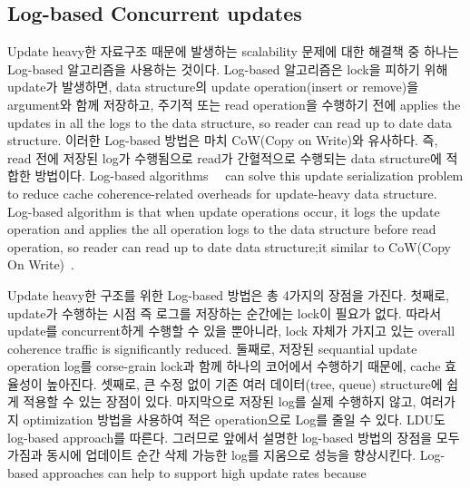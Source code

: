 \subsection{Log-based Concurrent updates}


\ifkor
Update heavy한 자료구조 때문에 발생하는 scalability 문제에 대한 해결책 중 하나는 Log-based 알고리즘을 사용하는
것이다.
Log-based 알고리즘은 lock을 피하기 위해 update가 발생하면, data structure의 update
operation(insert or remove)을 argument와 함께 저장하고, 주기적 또는 read operation을 수행하기 전에
applies the updates in all the logs to the data structure, so reader can read up to date data structure.
이러한 Log-based 방법은 마치 CoW(Copy on Write)와 유사하다.
즉, read 전에 저장된 log가 수행됨으로 read가 간혈적으로 수행되는 data structure에 적합한 방법이다.
\else
Log-based algorithms~\cite{Hendler2010FC}~\cite{SilasBoydWickizerPth} can solve
this update serialization problem to reduce cache coherence-related overheads
for update-heavy data structure.
Log-based algorithm is that when update operations occur, it logs the update
operation and applies the all operation logs to the data structure
before read operation, so reader can read up to date data structure;it similar
to CoW(Copy On Write)~\cite{PaulDetailLWN}.


\fi

%
\ifkor
Update heavy한 구조를 위한 Log-based 방법은 총 4가지의 장점을 가진다. 
첫째로, update가 수행하는 시점 즉 로그를 저장하는 순간에는 lock이 필요가 없다. 
따라서 update를 concurrent하게 수행할 수 있을 뿐아니라, lock 자체가 가지고 있는 overall
coherence traffic is significantly reduced.
둘째로, 저장된 sequantial update operation log를 corse-grain lock과 함께 하나의 코어에서 수행하기
때문에, cache 효율성이 높아진다.
셋째로, 큰 수정 없이 기존 여러 데이터(tree, queue) structure에 쉽게 적용할 수 있는 장점이 있다.
마지막으로 저장된 log를 실제 수행하지 않고, 여러가지 optimization 방법을 사용하여 적은 operation으로 Log를 줄일 수
있다. 
LDU도 log-based approach를 따른다. 그러므로 앞에서 설명한 log-based 방법의 장점을 모두 가짐과 동시에
업데이트 순간 삭제 가능한 log를 지움으로 성능을 향상시킨다.
\else
Log-based approaches can help to support high update rates because

